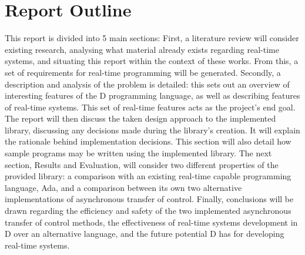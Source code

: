 \section{Report Outline} %
This report is divided into 5 main sections:
First, a literature review will 
consider existing research, analysing what material already exists regarding 
real-time systems, and situating this report within the context of these works. 
From this, a set of requirements for real-time programming will be generated. 
Secondly, a description and analysis of the problem is detailed: this sets out 
an overview of interesting features of the D programming language, as well as 
describing features of real-time systems. This set of real-time features acts as 
the project's end goal. 
The report will then discuss the taken design approach to the implemented library,
discussing any decisions made during the library's creation. It will explain the 
rationale behind implementation decisions. This section will also detail 
how sample programs may be written using the implemented library. 
The next section, Results and Evaluation, will consider two different properties 
of the provided library: a comparison with an existing real-time capable programming 
language, Ada, and a comparison between its own two alternative implementations 
of asynchronous transfer of control. 
Finally, conclusions will be drawn regarding the efficiency and safety of the 
two implemented asynchronous transfer of control methods, the effectiveness of 
real-time systems development in D over an alternative language, and the future 
potential D has for developing real-time systems.
